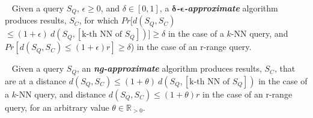 \vspace*{-0.4cm}
\begin{defn}~\cite{journal/pvldb/echihabi2018} \label{def:probmatch}
Given a query $S_Q$, $\epsilon \geq 0$, and $\delta \in [0,1]$, a \textit{\textbf{$\bm{\delta}$-$\bm{\epsilon}$-approximate}} algorithm produces results, $S_C$, for which $Pr[d(S_Q,S_C)$ $\leq (1+\epsilon)\ d(S_Q,[\text{k-th NN of }S_Q])] \geq \delta$ in the case of a $k$-NN query, and $Pr[d(S_Q,S_C) \leq (1+\epsilon)r] \geq \delta$) in the case of an r-range query.
\end{defn}
\vspace*{-0.4cm}
\begin{defn}~\cite{journal/pvldb/echihabi2018} \label{def:appmatch}
Given a query $S_Q$, an \textit{\textbf{ng-approximate}} algorithm produces results, $S_C$, that are at a distance $d(S_Q,S_C) \leq (1+\theta)\ d(S_Q,[\text{k-th NN of }S_Q])$ in the case of a $k$-NN query, and distance $d(S_Q,S_C) \leq (1+\theta)r$ in the case of an r-range query, for an arbitrary value $\theta \in \mathbb{R}_{>0}$.
\end{defn}
